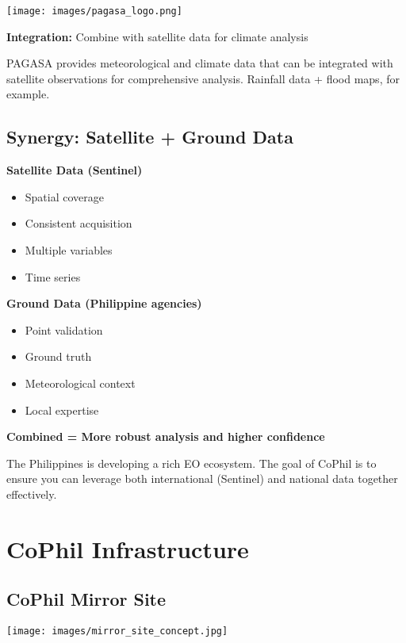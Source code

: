 \documentclass[
  letterpaper,
  DIV=11,
  numbers=noendperiod]{scrartcl}
\providecommand{\tightlist}{%
  \setlength{\itemsep}{0pt}\setlength{\parskip}{0pt}}
\begin{document}
\texttt{[image: images/pagasa\_logo.png]}

\textbf{Integration:} Combine with satellite data for climate analysis

PAGASA provides meteorological and climate data that can be integrated
with satellite observations for comprehensive analysis. Rainfall data +
flood maps, for example.

\subsection{Synergy: Satellite + Ground
Data}\label{synergy-satellite-ground-data}

\textbf{Satellite Data (Sentinel)}

\begin{itemize}
\tightlist
\item
  Spatial coverage
\item
  Consistent acquisition
\item
  Multiple variables
\item
  Time series
\end{itemize}

\textbf{Ground Data (Philippine agencies)}

\begin{itemize}
\tightlist
\item
  Point validation
\item
  Ground truth
\item
  Meteorological context
\item
  Local expertise
\end{itemize}

\textbf{Combined = More robust analysis and higher confidence}

The Philippines is developing a rich EO ecosystem. The goal of CoPhil is
to ensure you can leverage both international (Sentinel) and national
data together effectively.

\section{CoPhil Infrastructure}\label{cophil-infrastructure}

\subsection{CoPhil Mirror Site}\label{cophil-mirror-site}

\begin{center}
\texttt{[image: images/mirror\_site\_concept.jpg]}
\end{center}
\end{document}
